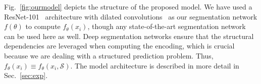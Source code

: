 \documentclass[10pt,twocolumn,letterpaper]{article}
\begin{document}
Fig.~\ref{fig:ourmodel} depicts the structure of the proposed model. We have used a ResNet-101~\cite{resnet} architecture with dilated convolutions~\cite{deeplab} as our segmentation network $f(\theta)$ to compute $f_\theta(x_i)$, though any state-of-the-art segmentation network can be used here as well. Deep segmentation networks ensure that the structural dependencies are leveraged when computing the encoding, which is crucial because we are dealing with a structured prediction problem. Thus, $f_\theta(x_i) \equiv f_\theta(x_i, \mathcal{S})$.
The model architecture is described in more detail in Sec.~\ref{sec:exp}.
\end{document}
